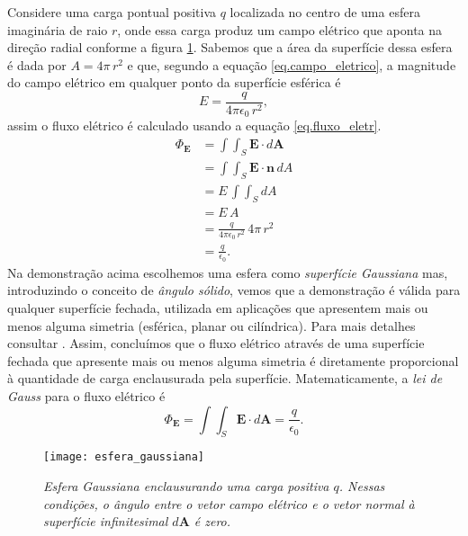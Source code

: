 Considere uma carga pontual positiva $q$ localizada no centro de uma esfera imaginária de raio $r$, onde essa carga produz um campo elétrico que aponta na direção radial conforme a figura \ref{fig.esfe_gauss}. Sabemos que a área da superfície dessa esfera é dada por $A=4\pi\,r^2$ e que, segundo a equação \ref{eq.campo_eletrico}, a magnitude do campo elétrico em qualquer ponto da superfície esférica é
\begin{equation*}
E=\frac{q}{4\pi\epsilon_0\,r^2},
\end{equation*}
assim o fluxo elétrico é calculado usando a equação \ref{eq.fluxo_eletr}.
\begin{align*}
\Phi_\textbf{E}&=\int\int_S\textbf{E}\cdot\textit{d}\textbf{A}\\
&=\int\int_S\textbf{E}\cdot\textbf{n}\,\textit{d}A\\
&=E\,\int\int_S\textit{d}A\\
&=E\,A\\
&=\frac{q}{4\pi\epsilon_0\,r^2}\,4\pi\,r^2\\
&=\frac{q}{\epsilon_0}.
\end{align*}
Na demonstração acima escolhemos uma esfera como \textit{superfície Gaussiana} mas, introduzindo o conceito de \textit{ângulo sólido}, vemos que a demonstração é válida para qualquer superfície fechada, utilizada em aplicações que apresentem mais ou menos alguma simetria (esférica, planar ou cilíndrica). Para mais detalhes consultar \cite{jackson_classical_1999}. Assim, concluímos que o fluxo elétrico através de uma superfície fechada que apresente mais ou menos alguma simetria é diretamente proporcional à quantidade de carga enclausurada pela superfície. Matematicamente, a \textit{lei de Gauss} para o fluxo elétrico é
\begin{equation*}
\Phi_\textbf{E}=\int\int_S\textbf{E}\cdot\textit{d}\textbf{A}=\frac{q}{\epsilon_0}.
\end{equation*}
\begin{figure}[!htb]
\centering
\texttt{[image: esfera\_gaussiana]}
\caption{\textit{Esfera Gaussiana enclausurando uma carga positiva $q$. Nessas condições, o ângulo entre o vetor campo elétrico e o vetor normal à superfície infinitesimal $d\textbf{A}$ é zero.}}
\label{fig.esfe_gauss}
\end{figure}


